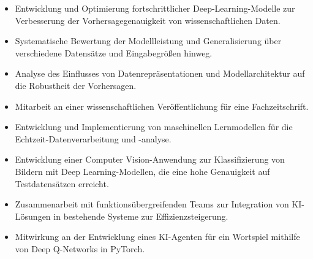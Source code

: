 \documentclass[9pt,a4paper,ragged2e,withhyper]{altacv}
\begin{document}
\begin{paracol}{2}
            \begin{itemize}
                \item Entwicklung und Optimierung fortschrittlicher Deep-Learning-Modelle zur Verbesserung der Vorhersagegenauigkeit von wissenschaftlichen Daten.
                \item Systematische Bewertung der Modellleistung und Generalisierung über verschiedene Datensätze und Eingabegrößen hinweg.
                \item Analyse des Einflusses von Datenrepräsentationen und Modellarchitektur auf die Robustheit der Vorhersagen.
                \item Mitarbeit an einer wissenschaftlichen Veröffentlichung für eine Fachzeitschrift.
            \end{itemize}
            \vspace{0.5em}
            \begin{itemize}
                \item Entwicklung und Implementierung von maschinellen Lernmodellen für die Echtzeit-Datenverarbeitung und -analyse.
                \item Entwicklung einer Computer Vision-Anwendung zur Klassifizierung von Bildern mit Deep Learning-Modellen, die eine hohe Genauigkeit auf Testdatensätzen erreicht.
                \item Zusammenarbeit mit funktionsübergreifenden Teams zur Integration von KI-Lösungen in bestehende Systeme zur Effizienzsteigerung.
                \item Mitwirkung an der Entwicklung eines KI-Agenten für ein Wortspiel mithilfe von Deep Q-Networks in PyTorch.
            \end{itemize}
            \vspace{0.5em}
        

\end{paracol}
\end{document}
